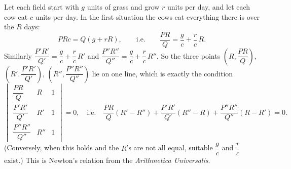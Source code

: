 Let each field start with $g$ units of grass and grow $r$ units per day, and let each cow eat $c$ units per day. In the first situation the cows eat everything there is over the $R$ days:
\[
PRc=Q(g+rR),\qquad\text{i.e.}\qquad \dfrac{PR}{Q}=\dfrac {g}{c}+\dfrac {r}{c}\,R .
\]
Similarly $\dfrac{P'R'}{Q'}=\dfrac {g}{c}+\dfrac {r}{c}\,R'$ and $\dfrac{P''R''}{Q''}=\dfrac {g}{c}+\dfrac {r}{c}\,R''$. So the three points $\left(R,\dfrac{PR}{Q}\right)$, $\left(R',\dfrac{P'R'}{Q'}\right)$, $\left(R'',\dfrac{P''R''}{Q''}\right)$ lie on one line, which is exactly the condition
\[
\begin{vmatrix}\dfrac{PR}{Q}&R&1\\[2mm]\dfrac{P'R'}{Q'}&R'&1\\[2mm]\dfrac{P''R''}{Q''}&R''&1\end{vmatrix}=0,
\quad\text{i.e.}\quad
\boxed{\dfrac{PR}{Q}(R'-R'')+\dfrac{P'R'}{Q'}(R''-R)+\dfrac{P''R''}{Q''}(R-R')=0.}
\]
(Conversely, when this holds and the $R$'s are not all equal, suitable $\dfrac {g}{c}$ and $\dfrac {r}{c}$ exist.) This is Newton's relation from the \emph{Arithmetica Universalis}.
